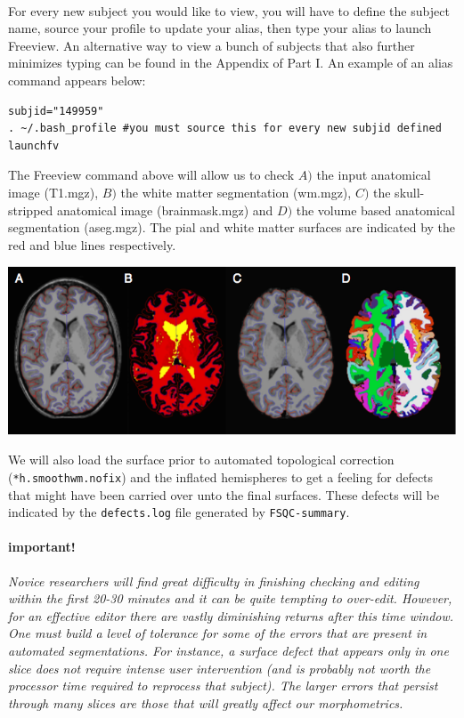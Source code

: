 \documentclass[paper=a4, fontsize=11pt]{scrartcl} %
\numberwithin{equation}{section} %
\numberwithin{figure}{section} %
\numberwithin{table}{section} %
\begin{document}
~\\For every new subject you would like to view, you will have to define the subject name, source your profile to update your alias, then type your alias to launch Freeview. An alternative way to view a bunch of subjects that also further minimizes typing can be found in the Appendix of Part I. An example of an alias command appears below:
~\\
\begin{lstlisting}[frame=single]
subjid="149959"
. ~/.bash_profile #you must source this for every new subjid defined
launchfv
\end{lstlisting}

The Freeview command above will allow us to check $A)$ the input anatomical image (T1.mgz), $B)$ the white matter segmentation (wm.mgz), $C)$ the skull-stripped anatomical image (brainmask.mgz) and $D)$ the volume based anatomical segmentation (aseg.mgz).  The pial and white matter surfaces are indicated by the red and blue lines respectively.  

\includegraphics[scale=0.6]{check.png}

We will also load the surface prior to automated topological correction (\texttt{*h.smoothwm.nofix}) and the inflated hemispheres to get a feeling for defects that might have been carried over unto the final surfaces.  These defects will be indicated by the \texttt{defects.log} file generated by \texttt{FSQC-summary}.

\paragraph{important!} \textit{Novice researchers will find great difficulty in finishing checking and editing within the first 20-30 minutes and it can be quite tempting to over-edit.  However, for an effective editor there are vastly diminishing returns after this time window.  One must build a level of tolerance for some of the errors that are present in automated segmentations.  For instance, a surface defect that appears only in one slice does not require intense user intervention (and is probably not worth the processor time required to reprocess that subject).  The larger errors that persist through many slices are those that will greatly affect our morphometrics.}
\end{document}
